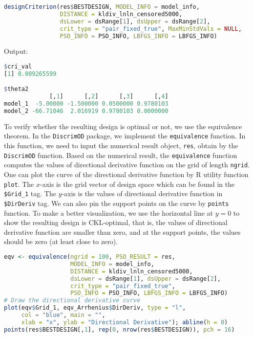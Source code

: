 \begin{lstlisting}[language=R, caption={Verifying Design Stability and Parameter Search}]
designCriterion(res$BESTDESIGN, MODEL_INFO = model_info,
                DISTANCE = kldiv_lnln_censored5000,
                dsLower = dsRange[1], dsUpper = dsRange[2],
                crit_type = "pair_fixed_true", MaxMinStdVals = NULL,
                PSO_INFO = PSO_INFO, LBFGS_INFO = LBFGS_INFO)
\end{lstlisting}

Output:

\begin{lstlisting}[language=R, caption={The Output of Verifying Design Stability and Parameter Search}]
$cri_val
[1] 0.009265599

$theta2
             [,1]      [,2]      [,3]      [,4]
model_1  -5.00000 -1.500000 0.0500000 0.9780103
model_2 -66.71046  2.016919 0.9780103 0.0000000
\end{lstlisting}

\hspace*{8mm} To verify whether the resulting design is optimal or not, we use the equivalence theorem. In the \verb|DiscrimOD| package, we implement the \verb|equivalence| function. In this function, we need to input the numerical result object, \verb|res|, obtain by the \verb|DiscrimOD| function. Based on the numerical result, the \verb|equivalence| function computes the values of directional derivative function on the grid of length \verb|ngrid|. One can plot the curve of the directional derivative function by R utility function \verb|plot|. The $x$-axis is the grid vector of design space which can be found in the \verb|$Grid_1| tag. The $y$-axis is the values of directional derivative function in \verb|$DirDeriv| tag. We can also pin the support points on the curve by \verb|points| function. To make a better visualization, we use the horizontal line at $y=0$ to show the resulting design is CKL-optimal, that is, the values of directional derivative function are smaller than zero, and at the support points, the values should be zero (at least close to zero).

\begin{lstlisting}[language=R, caption={Equivalence Theorem and Graphical Verification of Optimality}]
eqv <- equivalence(ngrid = 100, PSO_RESULT = res,
                   MODEL_INFO = model_info,
                   DISTANCE = kldiv_lnln_censored5000,
                   dsLower = dsRange[1], dsUpper = dsRange[2],
                   crit_type = "pair_fixed_true",
                   PSO_INFO = PSO_INFO, LBFGS_INFO = LBFGS_INFO)
# Draw the directional derivative curve
plot(eqv$Grid_1, eqv_Arrhenius$DirDeriv, type = "l",
     col = "blue", main = "",
     xlab = "x", ylab = "Directional Derivative"); abline(h = 0)
points(res$BESTDESIGN[,1], rep(0, nrow(res$BESTDESIGN)), pch = 16)
\end{lstlisting}


